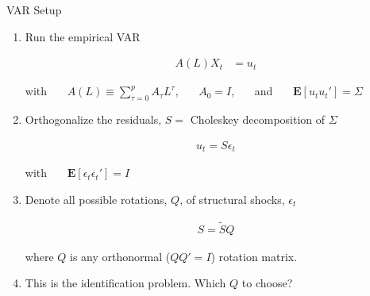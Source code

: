 \begin{frame}{VAR Setup}

  \begin{enumerate}
    \item Run the empirical VAR
  
    \vspace{-1cm}
    \begin{align*}
      A(L) X_t &= u_t
    \end{align*}
    \vspace{-1cm}
  
    with \ \ \ $A(L) \equiv \sum_{\tau = 0}^{p} A_\tau L^\tau$, \ \ \ $A_0 = I$, \ \ \ and \ \ \ $\mathbf{E}[u_t u_t'] = \Sigma$
  
    \item Orthogonalize the residuals, $S = $ Choleskey decomposition of $\Sigma$
    
    \vspace{-1cm}
    \begin{align*}
      u_t = S \epsilon_t
    \end{align*}
    \vspace{-1cm}
  
    with \ \ \ $\mathbf{E}[\epsilon_t \epsilon_t'] = I$
  
    \item Denote all possible rotations, $Q$, of structural shocks, $\epsilon_t$
    
    \vspace{-1cm}
    \begin{align*}
      S = \tilde{S}Q
    \end{align*}
    \vspace{-1cm}
  
    where $Q$ is any orthonormal ($QQ' = I$) rotation matrix.
  
    \item This is the identification problem. Which $Q$ to choose?
  \end{enumerate}
  
  \end{frame}
  
